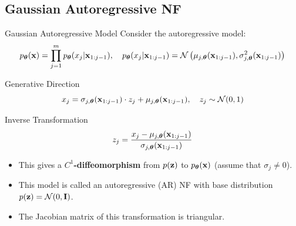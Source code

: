 \documentclass{beamer}
\begin{document}
\subsection{Gaussian Autoregressive NF}
\begin{frame}{Gaussian Autoregressive Model}
	Consider the autoregressive model:
	\vspace{-0.3cm}
	{\small
		\[
		p_{\boldsymbol{\theta}}(\mathbf{x}) = \prod_{j=1}^m p_{\boldsymbol{\theta}}(x_j | \mathbf{x}_{1:j-1}), \quad
		p_{\boldsymbol{\theta}}(x_j | \mathbf{x}_{1:j-1}) = \mathcal{N} \left(\mu_{j, \boldsymbol{\theta}}(\mathbf{x}_{1:j-1}), \sigma^2_{j, \boldsymbol{\theta}} (\mathbf{x}_{1:j-1})\right)
		\]
	}
	\vspace{-0.5cm}
	\eqpause
	\begin{block}{Generative Direction}
		\vspace{-0.3cm}
		\[
		x_j = \sigma_{j, \boldsymbol{\theta}} (\mathbf{x}_{1:j-1}) \cdot z_j + \mu_{j, \boldsymbol{\theta}}(\mathbf{x}_{1:j-1}), \quad z_j \sim \mathcal{N}(0, 1)
		\]
		\vspace{-0.7cm}
	\end{block}
	\eqpause
	\begin{block}{Inverse Transformation}
		\vspace{-0.5cm}
		\[
		z_j = \frac{x_j - \mu_{j, \boldsymbol{\theta}}(\mathbf{x}_{1:j-1})}{\sigma_{j, \boldsymbol{\theta}} (\mathbf{x}_{1:j-1}) }
		\]
		\vspace{-0.4cm}
	\end{block}
	\eqpause
	\begin{itemize}
		\item This gives a \textbf{$C^1$-diffeomorphism} from $p(\mathbf{z})$ to $p_{\boldsymbol{\theta}}(\mathbf{x})$ (assume that $\sigma_j \neq 0$).
		    \eqpause
		\item This model is called an autoregressive (AR) NF with base distribution $p(\mathbf{z}) = \mathcal{N}(0, \mathbf{I})$.
		    \eqpause
		\item The Jacobian matrix of this transformation is triangular.
	\end{itemize}
\end{frame}
\end{document}

